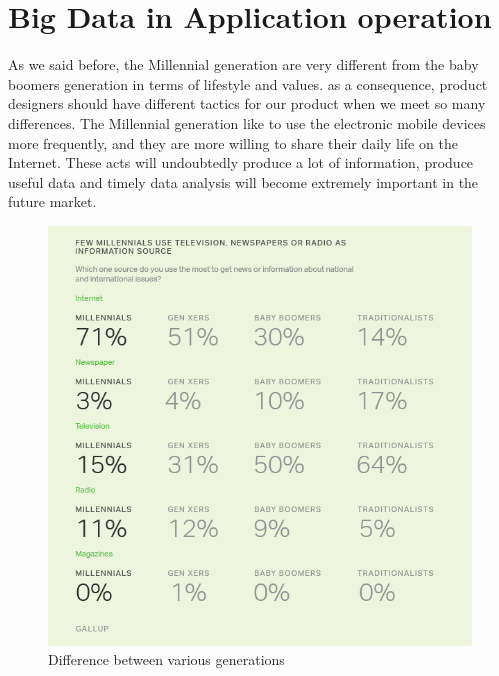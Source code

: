 \documentclass[sigconf]{acmart}
\begin{document}
\section{Big Data in Application operation}
As we said before, the Millennial generation are very different from the baby boomers generation in terms of lifestyle and values. as a consequence, product designers should have different tactics for our product when we meet so many differences. The Millennial generation like to use the electronic mobile devices more frequently, and they are more willing to share their daily life on the Internet. These acts will undoubtedly produce a lot of information, produce useful data and timely data analysis will become extremely important in the future market.
\begin{figure}[!ht]
  \centering\includegraphics[width=\columnwidth]{images/relation.png}
  \caption{Difference between various generations \cite{part-reg}}
  \label{Figure 1}
\end{figure}
\end{document}
